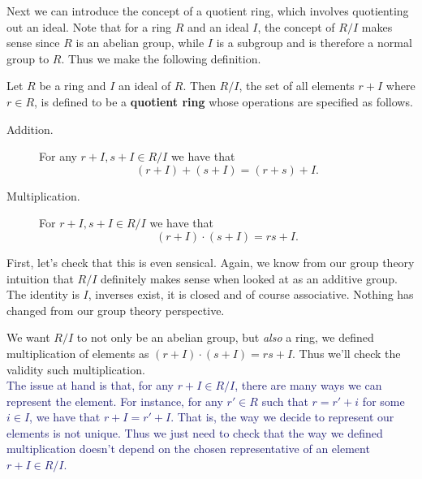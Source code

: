     Next we can introduce the concept of a quotient ring, which
    involves quotienting out an ideal. Note that for a ring $R$
    and an ideal $I$, the concept of $R/I$ makes sense since $R$
    is an abelian group, while $I$ is a subgroup and is therefore a
    normal group to $R$. Thus we make the following definition.

    \begin{definition}
        Let $R$ be a ring and $I$ an ideal of $R$. Then $R/I$, the
        set of all elements $r + I$ where $r \in R$, is
        defined to be a \textbf{quotient ring} whose operations
        are specified as follows. 
        \begin{description}
            \item[Addition.] For any $r + I, s + I \in R/I$ we have
            that 
            \[
                (r + I) + (s + I) = (r + s) + I.
            \]
            \item[Multiplication.]
            For $r + I, s + I \in R/I$ we have that 
            \[
                (r + I)\cdot(s + I) = rs + I.
            \]
        \end{description}
    \end{definition}
    First, let's check that this is even sensical. Again, we know from
    our group theory intuition that $R/I$ definitely makes sense
    when looked at as an additive group. The identity is $I$,
    inverses exist, it is closed and of course associative. Nothing has changed from our
    group theory perspective. 

    We want $R/I$ to not only be an abelian group, but
    \textit{also} a ring, we defined multiplication of elements as
    $(r + I)\cdot(s + I) = rs + I$. Thus we'll check the validity
    such multiplication. 
    \\

    \textcolor{MidnightBlue}{The issue at hand is that, for any $r +
    I \in R/I$, there are many ways we can represent the element.
    For instance, for any $r' \in R$ such that $r = r' + i$ for
    some $i \in I$, we have that $r + I = r' + I$. That is, the way we
    decide to represent our elements is not unique. Thus we just
    need to check that the way we defined multiplication doesn't
    depend on the chosen representative of an element $r + I \in
    R/I$.}
    
